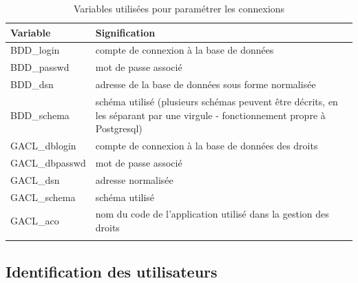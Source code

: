 \begin{longtable}{|p{4cm}|p{11cm}|}
\hline
\textbf{Variable} & \textbf{Signification} \\
\hline
\endhead
BDD\_login & compte de connexion à la base de données \\
\hline
BDD\_passwd & mot de passe associé\\
\hline
BDD\_dsn & adresse de la base de données sous forme normalisée\\
\hline
BDD\_schema & schéma utilisé (plusieurs schémas peuvent être décrits, en les séparant par une virgule - fonctionnement propre à Postgresql)\\
\hline
GACL\_dblogin & compte de connexion à la base de données des droits\\
\hline
GACL\_dbpasswd & mot de passe associé\\
\hline
GACL\_dsn & adresse normalisée \\
\hline
GACL\_schema & schéma utilisé\\
\hline
GACL\_aco & nom du code de l'application utilisé dans la gestion des droits\\
\hline
\caption{Variables utilisées pour paramétrer les connexions}
\end{longtable}

\subsection{Identification des utilisateurs}

